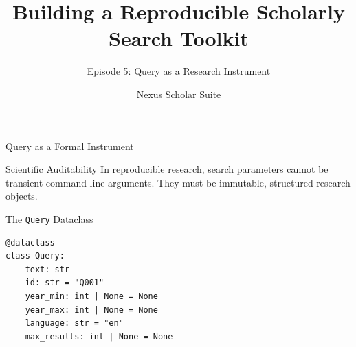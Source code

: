 \documentclass[aspectratio=169]{beamer}
\title{Building a Reproducible Scholarly Search Toolkit}
\subtitle{Episode 5: Query as a Research Instrument}
\author{Nexus Scholar Suite}
\date{}
\begin{document}
\begin{frame}[plain]
  \titlepage
\end{frame}

\begin{frame}{Query as a Formal Instrument}
  \begin{alertblock}{Scientific Auditability}
    In reproducible research, search parameters cannot be transient command line arguments. They must be immutable, structured research objects.
  \end{alertblock}
  \vspace{0.3cm}
  \begin{center}
  \end{center}
\end{frame}

\begin{frame}[fragile]{The \texttt{Query} Dataclass}
\begin{lstlisting}[style=nexuspython]
@dataclass
class Query:
    text: str
    id: str = "Q001"
    year_min: int | None = None
    year_max: int | None = None
    language: str = "en"
    max_results: int | None = None
\end{lstlisting}
\end{frame}
\end{document}
